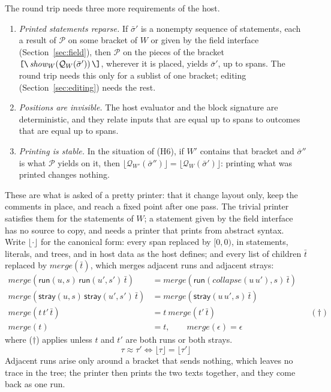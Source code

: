 \documentclass[11pt]{article}
\numberwithin{equation}{section}
\newcommand{\kw}[1]{\ensuremath{\mathsf{#1}}}
\newcommand{\str}[1]{\ensuremath{\text{\texttt{#1}}}}
\newcommand{\bs}{\textbackslash}
\newcommand{\Open}{\str{[\bs}}
\newcommand{\Close}{\str{\bs]}}
\begin{document}
The round trip needs three more requirements of the host.
\begin{enumerate}
\item[(H6)] \emph{Printed statements reparse.}  If $\bar\sigma'$ is a
      nonempty sequence of statements, each a result of $\mathcal{P}$ on
      some bracket of $W$ or given by the field interface
      (Section~\ref{sec:field}), then $\mathcal{P}$ on the pieces of the
      bracket $\Open\,\mathit{show}_W(\mathcal{Q}_W(\bar\sigma'))\,\Close$,
      wherever it is placed, yields $\bar\sigma'$, up to spans.  The round
      trip needs this only for a sublist of one bracket; editing
      (Section~\ref{sec:editing}) needs the rest.
\item[(H7)] \emph{Positions are invisible.}  The host evaluator and the
      block signature are deterministic, and they relate inputs that are
      equal up to spans to outcomes that are equal up to spans.
\item[(H8)] \emph{Printing is stable.}  In the situation of (H6), if
      $W'$ contains that bracket and $\bar\sigma''$ is what $\mathcal{P}$
      yields on it, then
      $\lfloor \mathcal{Q}_{W'}(\bar\sigma'') \rfloor =
      \lfloor \mathcal{Q}_W(\bar\sigma') \rfloor$: printing what was
      printed changes nothing.
\end{enumerate}
These are what is asked of a pretty printer: that it change layout only,
keep the comments in place, and reach a fixed point after one pass.  The
trivial printer satisfies them for the statements of $W$; a statement given
by the field interface has no source to copy, and needs a printer that
prints from abstract syntax.
Write $\lfloor \cdot \rfloor$ for the canonical form: every span replaced
by $[0, 0)$, in statements, literals, and trees, and in host data as the
host defines; and every list of children $\bar t$ replaced by
$\mathit{merge}(\bar t)$, which merges adjacent runs and adjacent strays:
\begin{equation}\label{eq:merge}
\begin{aligned}
\mathit{merge}(\kw{run}(u, s)\,\kw{run}(u', s')\,\bar t) &=
  \mathit{merge}(\kw{run}(\mathit{collapse}(u\,u'), s)\,\bar t) \\
\mathit{merge}(\kw{stray}(u, s)\,\kw{stray}(u', s')\,\bar t) &=
  \mathit{merge}(\kw{stray}(u\,u', s)\,\bar t) \\
\mathit{merge}(t\,t'\,\bar t) &= t\ \mathit{merge}(t'\,\bar t)
  && (\dagger) \\
\mathit{merge}(t) &= t, \qquad \mathit{merge}(\epsilon) = \epsilon
\end{aligned}
\end{equation}
where ($\dagger$) applies unless $t$ and $t'$ are both runs or both strays.
\begin{equation}\label{eq:canonical}
\tau \approx \tau' \iff \lfloor \tau \rfloor = \lfloor \tau' \rfloor
\end{equation}
Adjacent runs arise only around a bracket that sends nothing, which leaves
no trace in the tree; the printer then prints the two texts together, and
they come back as one run.
\end{document}
